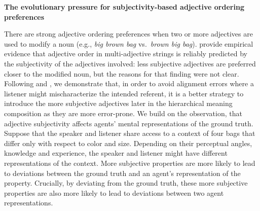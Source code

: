 \documentclass[12pt]{article}
\begin{document}
\setlength{\abovedisplayskip}{0.5pt}
\setlength{\belowdisplayskip}{0.5pt}


\begin{center}
	\textbf{The evolutionary pressure for subjectivity-based adjective ordering preferences}
\end{center}

\vspace{-5pt}

\noindent 
There are strong adjective ordering preferences when two or more adjectives are used to modify a noun (e.g., \emph{big brown bag} vs.~\emph{brown big bag}).  provide empirical evidence that adjective order in multi-adjective strings is reliably predicted by the subjectivity of the adjectives involved: less subjective adjectives are preferred closer to the modified noun, but the reasons for that finding were not clear. 
Following  and , we demonstrate that, in order to avoid alignment errors where a listener might mischaracterize the intended referent, it is a better strategy to introduce the more subjective adjectives later in the hierarchical meaning composition as they are more error-prone. We build on the observation, that adjective subjectivity affects agents' mental representations of the ground truth. Suppose that the speaker and listener share access to a context of four bags that differ only with respect to color and size. Depending on their perceptual angles, knowledge and experience, the speaker and listener might have different representations of the context. More subjective properties are more likely to lead to deviations between the ground truth and an agent's representation of the property. Crucially, by deviating from the ground truth, these more subjective properties are also more likely to lead to deviations between two agent representations. %
\end{document}
